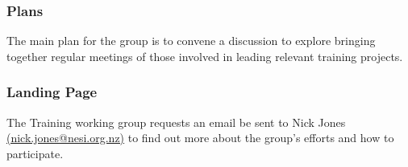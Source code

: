 \subsubsection{Plans}

The main plan for the group is to convene a discussion to explore bringing
together regular meetings of those involved in leading relevant training
projects.

\subsubsection{Landing Page}

The Training working group requests an email be sent to Nick Jones
\href{mailto:nick.jones@nesi.org.nz}{(nick.jones@nesi.org.nz)} to find out more
about the group's efforts and how to participate.
